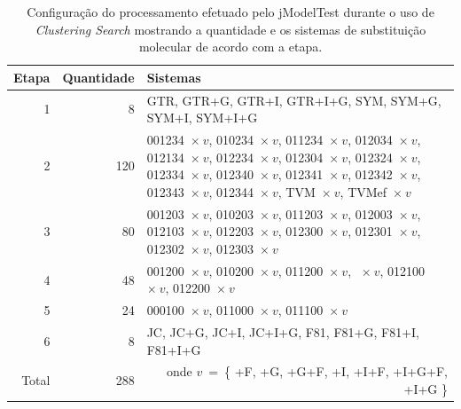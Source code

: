 \documentclass[english,brazilian]{UNISINOSmonografia} %
\newcommand\defaultFigureWidth{0.9}
\begin{document}
\begin{table}[tb]
	\centering%
	\begin{minipage}{\defaultFigureWidth\textwidth}
		\caption{Configuração do processamento efetuado pelo jModelTest durante o uso de \textit{Clustering Search} mostrando a quantidade e os sistemas de substituição molecular de acordo com a etapa.}
		\label{tab:modelo-elasticidade-jmodelsteps}
		\small
		\vspace{1ex}
		\renewcommand {\tabularxcolumn}[1]{>{\arraybackslash}m{#1}} %
		\begin{tabularx}{\textwidth}{rrX@{}}
			\toprule
			Etapa & Quantidade & {Sistemas} \\ 
			\midrule
			1 & 8 &  GTR, GTR+G, GTR+I, GTR+I+G, \newline SYM, SYM+G, SYM+I, SYM+I+G  \\
			2 & 120 &  001234~$\times~v$, 010234~$\times~v$, 011234~$\times~v$, 012034~$\times~v$, 012134~$\times~v$, 012234~$\times~v$, 012304~$\times~v$, 012324~$\times~v$, 012334~$\times~v$, 012340~$\times~v$, 012341~$\times~v$, 012342~$\times~v$, 012343~$\times~v$, 012344~$\times~v$, \newline TVM~$\times~v$, TVMef~$\times~v$  \\
			3 & 80 &  001203~$\times~v$, 010203~$\times~v$, 011203~$\times~v$, 012003~$\times~v$, 012103~$\times~v$, 012203~$\times~v$, 012300~$\times~v$, 012301~$\times~v$, 012302~$\times~v$, 012303~$\times~v$  \\
			4 & 48 &  001200~$\times~v$, 010200~$\times~v$, 011200~$\times~v$, \newline 012000~$\times~v$, 012100~$\times~v$, 012200~$\times~v$  \\
			5 & 24 &  000100~$\times~v$, 011000~$\times~v$, 011100~$\times~v$  \\
			6 & 8 &  JC, JC+G, JC+I, JC+I+G, \newline F81, F81+G, F81+I, F81+I+G  \\
			\bottomrule
			Total & 288 & \multicolumn{1}{r}{onde $ v~=~${\small \{ +F, +G, +G+F, +I, +I+F, +I+G+F, +I+G \}}} \\ 
		\end{tabularx}
	\end{minipage}
\end{table}
\end{document}
